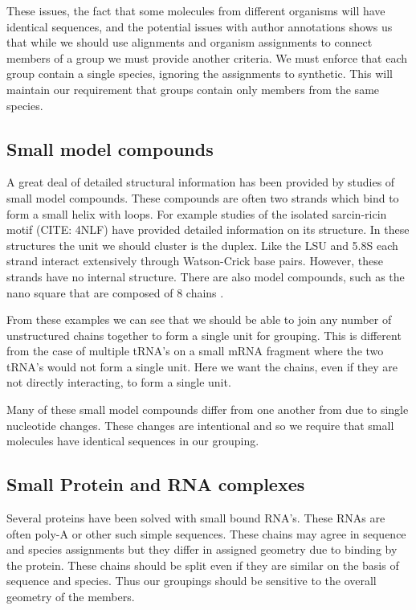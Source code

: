 These issues, the fact that some molecules from different organisms will have
identical sequences, and the potential issues with author annotations shows us
that while we should use alignments and organism assignments to connect members
of a group we must provide another criteria. We must enforce that each group
contain a single species, ignoring the assignments to synthetic. This will
maintain our requirement that groups contain only members from the same species.

\subsection{Small model compounds}

A great deal of detailed structural information has been provided by studies of
small model compounds. These compounds are often two strands which bind to form
a small helix with loops. For example studies of the isolated sarcin-ricin motif
(CITE: 4NLF) have provided detailed information on its structure. In these
structures the unit we should cluster is the duplex. Like the LSU and 5.8S each
strand interact extensively through Watson-Crick base pairs. However, these
strands have no internal structure. There are also model compounds, such as the
nano square that are composed of 8 chains \cite{Dibrov2011a}.

From these examples we can see that we should be able to join any number of
unstructured chains together to form a single unit for grouping. This is
different from the case of multiple tRNA's on a small mRNA fragment where the
two tRNA's would not form a single unit. Here we want the chains, even if they
are not directly interacting, to form a single unit.

Many of these small model compounds differ from one another from due to single
nucleotide changes. These changes are intentional and so we require that small
molecules have identical sequences in our grouping.

\subsection{Small Protein and RNA complexes}

Several proteins have been solved with small bound RNA's. These RNAs are often
poly-A or other such simple sequences. These chains may agree in sequence and
species assignments but they differ in assigned geometry due to binding by the
protein. These chains should be split even if they are similar on the basis of
sequence and species. Thus our groupings should be sensitive to the overall
geometry of the members.

